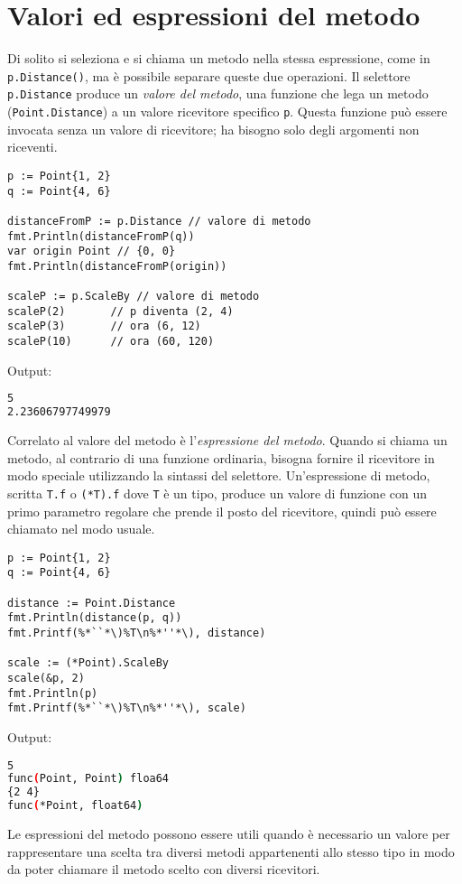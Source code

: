 \section{Valori ed espressioni del metodo}
\label{sec:valori_ed_espressioni_del_metodo}%
Di solito si seleziona e si chiama un metodo nella stessa espressione, come in \verb|p.Distance()|, ma è possibile separare queste due operazioni.
Il selettore \verb|p.Distance| produce un \textit{valore del metodo}, una funzione che lega un metodo (\verb|Point.Distance|) a un valore ricevitore specifico \verb|p|.
Questa funzione può essere invocata senza un valore di ricevitore;
ha bisogno solo degli argomenti non riceventi.
\begin{lstlisting}[frame=single, label={lst:lstlisting5-4.1}]
p := Point{1, 2}
q := Point{4, 6}

distanceFromP := p.Distance // valore di metodo
fmt.Println(distanceFromP(q))
var origin Point // {0, 0}
fmt.Println(distanceFromP(origin))

scaleP := p.ScaleBy // valore di metodo
scaleP(2)	    // p diventa (2, 4)
scaleP(3)	    // ora (6, 12)
scaleP(10)	    // ora (60, 120)
\end{lstlisting}
Output:
\begin{lstlisting}[language=bash, frame=L, label={lst:lstlisting5-4.2}]
5
2.23606797749979
\end{lstlisting}
Correlato al valore del metodo è l'\textit{espressione del metodo}.
Quando si chiama un metodo, al contrario di una funzione ordinaria, bisogna fornire il ricevitore in modo speciale utilizzando la sintassi del selettore.
Un'espressione di metodo, scritta \verb|T.f| o \verb|(*T).f| dove \verb|T| è un tipo, produce un valore di funzione con un primo parametro regolare che prende il posto del ricevitore, quindi può essere chiamato nel modo usuale.
\begin{lstlisting}[frame=single, label={lst:lstlisting5-4.3}]
p := Point{1, 2}
q := Point{4, 6}

distance := Point.Distance
fmt.Println(distance(p, q))
fmt.Printf(%*``*\)%T\n%*''*\), distance)

scale := (*Point).ScaleBy
scale(&p, 2)
fmt.Println(p)
fmt.Printf(%*``*\)%T\n%*''*\), scale)
\end{lstlisting}
Output:
\begin{lstlisting}[language=bash, frame=L, label={lst:lstlisting5-4.4}]
5
func(Point, Point) floa64
{2 4}
func(*Point, float64)
\end{lstlisting}
Le espressioni del metodo possono essere utili quando è necessario un valore per rappresentare una scelta tra diversi metodi appartenenti allo stesso tipo in modo da poter chiamare il metodo scelto con diversi ricevitori.
